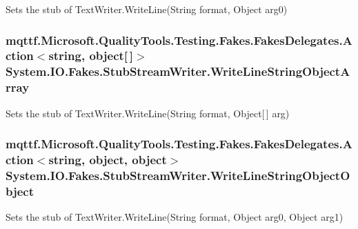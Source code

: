 Sets the stub of Text\-Writer.\-Write\-Line(\-String format, Object arg0)

\hypertarget{class_system_1_1_i_o_1_1_fakes_1_1_stub_stream_writer_a93994fe5e16c0bf75e8b6108fe64179f}{
\subsubsection[{Write\-Line\-String\-Object\-Array}]{\setlength{\rightskip}{0pt plus 5cm}mqttf.\-Microsoft.\-Quality\-Tools.\-Testing.\-Fakes.\-Fakes\-Delegates.\-Action$<$string, object\mbox{[}$\,$\mbox{]}$>$ System.\-I\-O.\-Fakes.\-Stub\-Stream\-Writer.\-Write\-Line\-String\-Object\-Array}}\label{class_system_1_1_i_o_1_1_fakes_1_1_stub_stream_writer_a93994fe5e16c0bf75e8b6108fe64179f}


Sets the stub of Text\-Writer.\-Write\-Line(\-String format, Object\mbox{[}$\,$\mbox{]} arg)

\hypertarget{class_system_1_1_i_o_1_1_fakes_1_1_stub_stream_writer_ad2a2ff90585b7b06f4217090017237b8}{
\subsubsection[{Write\-Line\-String\-Object\-Object}]{\setlength{\rightskip}{0pt plus 5cm}mqttf.\-Microsoft.\-Quality\-Tools.\-Testing.\-Fakes.\-Fakes\-Delegates.\-Action$<$string, object, object$>$ System.\-I\-O.\-Fakes.\-Stub\-Stream\-Writer.\-Write\-Line\-String\-Object\-Object}}\label{class_system_1_1_i_o_1_1_fakes_1_1_stub_stream_writer_ad2a2ff90585b7b06f4217090017237b8}


Sets the stub of Text\-Writer.\-Write\-Line(\-String format, Object arg0, Object arg1)

